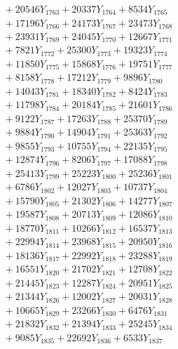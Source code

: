 \documentclass[a4paper,10pt]{article}
\begin{document}
{\begin{align}
&\;  + 20546 Y_{1763} + 20337 Y_{1764} + 8534 Y_{1765} \\[0.3ex]
&\;  + 17196 Y_{1766} + 24173 Y_{1767} + 23473 Y_{1768} \\[0.5ex]\allowbreak
&\;  + 23931 Y_{1769} + 24045 Y_{1770} + 12667 Y_{1771} \\[0.3ex]
&\;  + 7821 Y_{1772} + 25300 Y_{1773} + 19323 Y_{1774} \\[0.3ex]
&\;  + 11850 Y_{1775} + 15868 Y_{1776} + 19751 Y_{1777} \\[0.3ex]
&\;  + 8158 Y_{1778} + 17212 Y_{1779} + 9896 Y_{1780} \\[0.3ex]
&\;  + 14043 Y_{1781} + 18340 Y_{1782} + 8424 Y_{1783} \\[0.3ex]
&\;  + 11798 Y_{1784} + 20184 Y_{1785} + 21601 Y_{1786} \\[0.3ex]
&\;  + 9122 Y_{1787} + 17263 Y_{1788} + 25370 Y_{1789} \\[0.3ex]
&\;  + 9884 Y_{1790} + 14904 Y_{1791} + 25363 Y_{1792} \\[0.3ex]
&\;  + 9855 Y_{1793} + 10755 Y_{1794} + 22135 Y_{1795} \\[0.3ex]
&\;  + 12874 Y_{1796} + 8206 Y_{1797} + 17088 Y_{1798} \\[0.5ex]\allowbreak
&\;  + 25413 Y_{1799} + 25223 Y_{1800} + 25236 Y_{1801} \\[0.3ex]
&\;  + 6786 Y_{1802} + 12027 Y_{1803} + 10737 Y_{1804} \\[0.3ex]
&\;  + 15790 Y_{1805} + 21302 Y_{1806} + 14277 Y_{1807} \\[0.3ex]
&\;  + 19587 Y_{1808} + 20713 Y_{1809} + 12086 Y_{1810} \\[0.3ex]
&\;  + 18770 Y_{1811} + 10266 Y_{1812} + 16537 Y_{1813} \\[0.3ex]
&\;  + 22994 Y_{1814} + 23968 Y_{1815} + 20950 Y_{1816} \\[0.3ex]
&\;  + 18136 Y_{1817} + 22992 Y_{1818} + 23288 Y_{1819} \\[0.3ex]
&\;  + 16551 Y_{1820} + 21702 Y_{1821} + 12708 Y_{1822} \\[0.3ex]
&\;  + 21445 Y_{1823} + 12287 Y_{1824} + 20951 Y_{1825} \\[0.3ex]
&\;  + 21344 Y_{1826} + 12002 Y_{1827} + 20031 Y_{1828} \\[0.5ex]\allowbreak
&\;  + 10665 Y_{1829} + 23266 Y_{1830} + 6476 Y_{1831} \\[0.3ex]
&\;  + 21832 Y_{1832} + 21394 Y_{1833} + 25245 Y_{1834} \\[0.3ex]
&\;  + 9085 Y_{1835} + 22692 Y_{1836} + 6533 Y_{1837} \\[0.3ex]

\end{align}}
\end{document}
